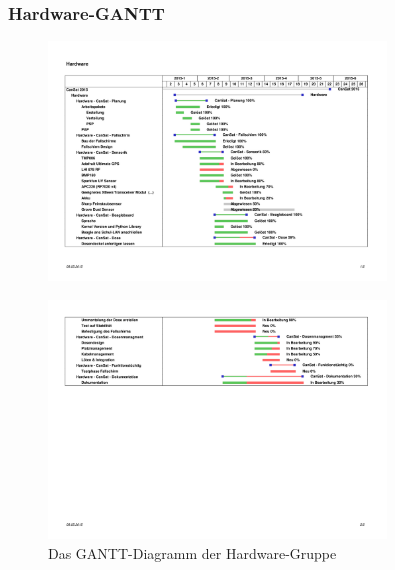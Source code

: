 \subsubsection {Hardware-GANTT}
\begin{figure}[htbp]
	\centering
	\includegraphics[trim = 10mm 50mm 20mm 65mm, clip,width=0.8\textwidth]{8_Anhang/hardware-gantt-1.png}
	\label{gantt_hardware_1}
\end{figure}
\vspace{-2cm}
\begin{figure}[htbp]
	\centering
	\includegraphics[trim = 11mm 350mm 20mm 40mm, clip,width=0.8\textwidth]{8_Anhang/hardware-gantt-2.png}
	\caption{Das GANTT-Diagramm der Hardware-Gruppe}
	\label{gantt_hardware_2}
\end{figure}

\newpage
